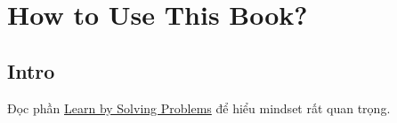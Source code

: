 \documentclass[a4paper]{report}
\begin{document}
\maketitle
\tableofcontents

\chapter{How to Use This Book?}

\section{Intro}

Đọc phần \href{https://artofproblemsolving.com/ebooks/prealgebra-ebook/par/154183}{Learn by Solving Problems} để hiểu mindset rất quan trọng.






\end{document}
